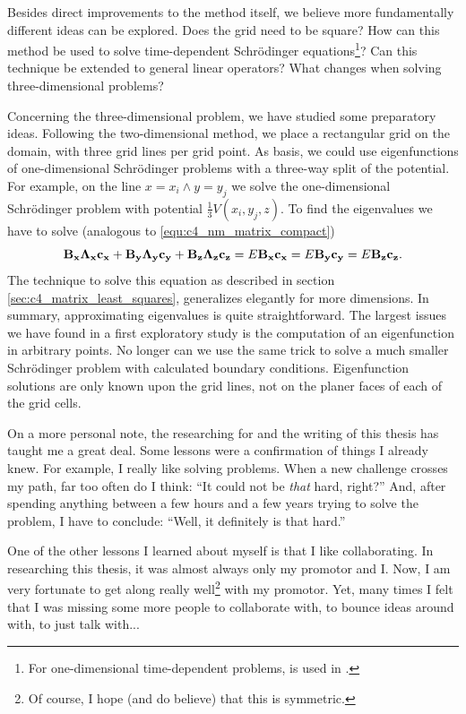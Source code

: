 Besides direct improvements to the method itself, we believe more fundamentally different ideas can be explored. Does the grid need to be square? How can this method be used to solve time-dependent Schrödinger equations\footnote{For one-dimensional time-dependent problems,  is used in \cite{ledoux_accurate_2014}.}? Can this technique be extended to general linear operators? What changes when solving three-dimensional problems?

Concerning the three-dimensional problem, we have studied some preparatory ideas. Following the two-dimensional method, we place a rectangular grid on the domain, with three grid lines per grid point. As basis, we could use eigenfunctions of one-dimensional Schrödinger problems with a three-way split of the potential. For example, on the line $x = x_i \land y = y_j$ we solve the one-dimensional Schrödinger problem with potential $\frac{1}{3} V(x_i, y_j, z)$. To find the eigenvalues we have to solve (analogous to \eqref{equ:c4_nm_matrix_compact})
$$
    \vb{B_x} \vb{\Lambda_x}\vb{c_x} + \vb{B_y} \vb{\Lambda_y}\vb{c_y} + \vb{B_z} \vb{\Lambda_z}\vb{c_z} = E \vb{B_x} \vb{c_x} = E \vb{B_y} \vb{c_y} = E \vb{B_z} \vb{c_z}\text{.}
$$
The technique to solve this equation as described in section \ref{sec:c4_matrix_least_squares}, generalizes elegantly for more dimensions. In summary, approximating eigenvalues is quite straightforward. The largest issues we have found in a first exploratory study is the computation of an eigenfunction in arbitrary points. No longer can we use the same trick to solve a much smaller Schrödinger problem with calculated boundary conditions. Eigenfunction solutions are only known upon the grid lines, not on the planer faces of each of the grid cells.

On a more personal note, the researching for and the writing of this thesis has taught me a great deal. Some lessons were a confirmation of things I already knew. For example, I really like solving problems. When a new challenge crosses my path, far too often do I think: ``It could not be \emph{that} hard, right?'' And, after spending anything between a few hours and a few years trying to solve the problem, I have to conclude: ``Well, it definitely is that hard.''

One of the other lessons I learned about myself is that I like collaborating. In researching this thesis, it was almost always only my promotor and I. Now, I am very fortunate to get along really well\footnote{Of course, I hope (and do believe) that this is symmetric.} with my promotor. Yet, many times I felt that I was missing some more people to collaborate with, to bounce ideas around with, to just talk with...

